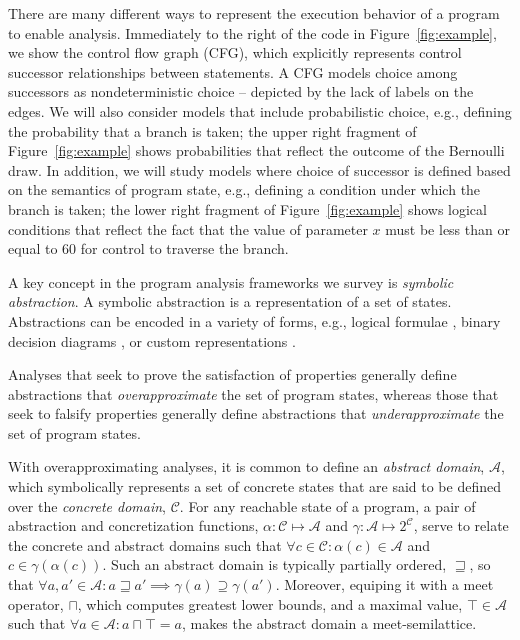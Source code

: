 There are many different ways to represent the execution behavior
of a program to enable analysis.  Immediately to the right of
the code in Figure~\ref{fig:example}, we show the control flow graph (CFG),
which explicitly represents control successor relationships between
statements.  A CFG models choice among successors as nondeterministic
choice -- depicted by the lack of labels on the edges.
We will also consider models that include probabilistic choice,
e.g., defining the probability that a branch is taken; the
upper right fragment of Figure~\ref{fig:example} shows probabilities
that reflect the outcome of the Bernoulli draw.
In addition, we will study models where 
choice of successor is defined based on the semantics
of program state, e.g., defining a condition under which the branch
is taken; the lower right fragment of Figure~\ref{fig:example}
shows logical conditions that 
reflect the fact that the value of parameter $x$ must be
less than or equal to $60$ for control to traverse the branch.

A key concept in the program analysis frameworks we survey is
\textit{symbolic abstraction}.  A symbolic abstraction is a 
representation of a set of states.  Abstractions can be encoded
in a variety of forms, e.g., logical formulae \cite{thakur2012bilateral}, binary
decision diagrams \cite{bryant1992symbolic}, or custom representations \cite{bagnara2008parma}.

Analyses that seek to prove the satisfaction of properties generally
define abstractions that \textit{overapproximate} the set of program
states, whereas those that seek to falsify properties generally define
abstractions that \textit{underapproximate} the set of program states.

With overapproximating analyses, it is common to define an \textit{abstract
domain}, $\mathcal{A}$, 
which symbolically represents a set of concrete states that
are said to be defined over the \textit{concrete domain}, $\mathcal{C}$.
For any reachable state of a program, a pair of abstraction 
and concretization functions, 
$\alpha : \mathcal{C} \mapsto \mathcal{A}$ and  
$\gamma : \mathcal{A} \mapsto 2^\mathcal{C}$,
serve to relate the concrete and abstract domains such that 
$\forall c \in \mathcal{C} : \alpha(c) \in \mathcal{A}$ and $c \in \gamma(\alpha(c))$.
Such an abstract domain is typically partially ordered, $\sqsupseteq$,
so that 
$\forall a,a' \in \mathcal{A} :  a \sqsupseteq a' \implies \gamma(a) \supseteq \gamma(a')$.
Moreover, equiping it with a meet operator, $\sqcap$, which
computes greatest lower bounds, and a maximal
value, $\top \in \mathcal{A}$ such that 
$\forall a \in \mathcal{A} : a \sqcap \top = a$, makes the
abstract domain a meet-semilattice.

